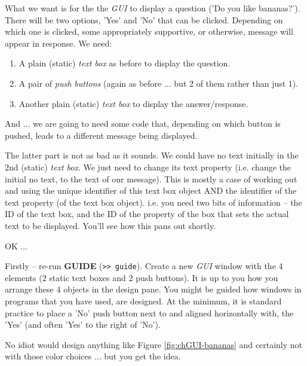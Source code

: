\documentclass{tufte-book} %
\begin{document}
What we want is for the the \textit{GUI} to display a question ('Do you like bananas?'). There will be two options, 'Yes' and 'No' that can be clicked. Depending on which one is clicked, some appropriately supportive, or otherwise, message will appear in response. We need:
\begin{enumerate}[noitemsep]
\setlength{\itemindent}{.2in}
\item A plain (static) \textit{text box} as before to display the question.
\item A pair of \textit{push buttons} (again as before ... but 2 of them rather than just 1).
\item Another plain (static) \textit{text box} to display the answer/response.
\end{enumerate}
And ... we are going to need some code that, depending on which button is pushed, leads to a different message being displayed.

The latter part is not as bad as it sounds. We could have no text initially in the 2nd (static) \textit{text box}. We just need to change its text property (i.e. change the initial no text, to the text of our message). This is mostly a case of working out and using the unique identifier of this text box object AND the identifier of the text property (of the text box object). i.e. you need two bits of information -- the ID of the text box, and the ID of the property of the box that sets the actual text to be displayed. You'll see how this pans out shortly.

OK ...

Firstly -- re-run \textbf{GUIDE} (\texttt{>> guide}). Create a new \textit{GUI} window with the 4 elements (2 static text boxes and 2 push buttons). It is up to you how you arrange these 4 objects in the design pane. You might be guided how windows in programs that you have used, are designed. At the minimum, it is standard practice to place a 'No' push button next to and aligned horizontally with, the 'Yes' (and often 'Yes' to the right of 'No').

No idiot would design anything like Figure \ref{fig:chGUI-bananas} and certainly not with those color choices ... but you get the idea.
\end{document}
